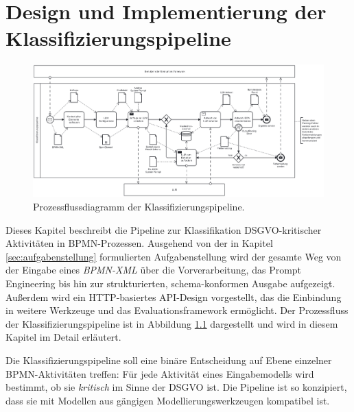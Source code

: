 \chapter{Design und Implementierung der Klassifizierungspipeline}\label{ch:klassifizierungsalgorithmus-(design-und-implementierung)}

\begin{figure}
    \centering
    \includegraphics[width=\textwidth]{images/classification/classification-pipeline-diagram}
    \caption{Prozessflussdiagramm der Klassifizierungspipeline.}
    \label{fig:architecture-diagram}
\end{figure}

Dieses Kapitel beschreibt die Pipeline zur Klassifikation \ac{DSGVO}-kritischer Aktivitäten in \ac{BPMN}-Prozessen. Ausgehend von der in Kapitel \ref{sec:aufgabenstellung} formulierten Aufgabenstellung wird der gesamte Weg von der Eingabe eines \emph{BPMN-XML} über die Vorverarbeitung, das Prompt Engineering bis hin zur strukturierten, schema-konformen Ausgabe aufgezeigt. Außerdem wird ein HTTP-basiertes API-Design vorgestellt, das die Einbindung in weitere Werkzeuge und das Evaluationsframework ermöglicht. Der Prozessfluss der Klassifizierungspipeline ist in Abbildung \ref{fig:architecture-diagram} dargestellt und wird in diesem Kapitel im Detail erläutert.

Die Klassifizierungspipeline soll eine binäre Entscheidung auf Ebene einzelner BPMN-Aktivitäten treffen: Für jede Aktivität eines Eingabemodells wird bestimmt, ob sie \emph{kritisch} im Sinne der \ac{DSGVO} ist. Die Pipeline ist so konzipiert, dass sie mit Modellen aus gängigen Modellierungswerkzeugen kompatibel ist.







